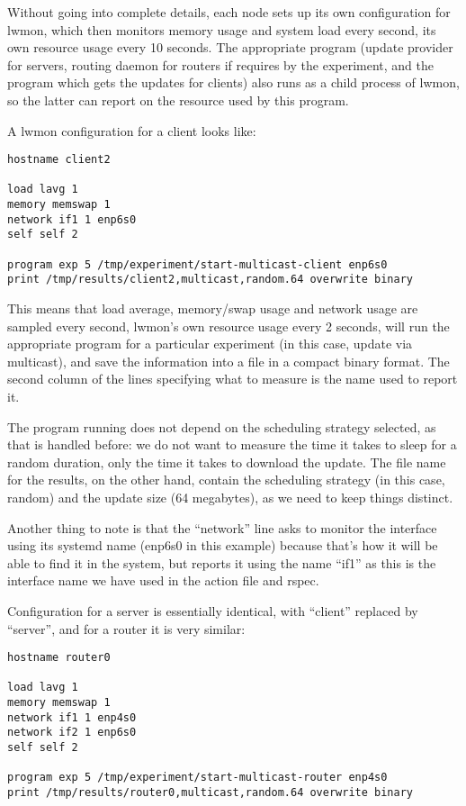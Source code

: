 \documentclass[a4paper,12pt]{article}
\begin{document}
Without going into complete details, each node sets up its own
configuration for lwmon, which then monitors memory usage and
system load every second, its own resource usage every 10
seconds.  The appropriate program (update provider for servers,
routing daemon for routers if requires by the experiment, and
the program which gets the updates for clients) also runs as
a child process of lwmon, so the latter can report on the resource
used by this program.

A lwmon configuration for a client looks like:

\begin{verbatim}
hostname client2

load lavg 1
memory memswap 1
network if1 1 enp6s0
self self 2

program exp 5 /tmp/experiment/start-multicast-client enp6s0
print /tmp/results/client2,multicast,random.64 overwrite binary
\end{verbatim}

This means that load average, memory/swap usage and network usage are
sampled every second, lwmon's own resource usage every 2 seconds, will
run the appropriate program for a particular experiment (in this case,
update via multicast), and save the information into a file in a compact
binary format. The second column of the lines specifying what to measure
is the name used to report it.

The program running does not depend on the scheduling strategy selected,
as that is handled before: we do not want to measure the time it takes
to sleep for a random duration, only the time it takes to download the
update.  The file name for the results, on the other hand, contain the
scheduling strategy (in this case, random) and the update size (64
megabytes), as we need to keep things distinct.

Another thing to note is that the ``network'' line asks to monitor
the interface using its systemd name (enp6s0 in this example) because
that's how it will be able to find it in the system, but reports it
using the name ``if1'' as this is the interface name we have used
in the action file and rspec.

Configuration for a server is essentially identical, with ``client''
replaced by ``server'', and for a router it is very similar:

\begin{verbatim}
hostname router0

load lavg 1
memory memswap 1
network if1 1 enp4s0
network if2 1 enp6s0
self self 2

program exp 5 /tmp/experiment/start-multicast-router enp4s0
print /tmp/results/router0,multicast,random.64 overwrite binary
\end{verbatim}
\end{document}
